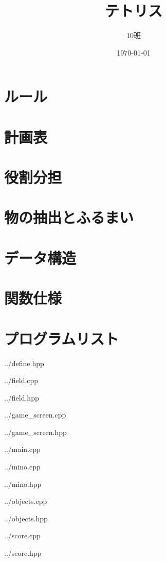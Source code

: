 \documentclass[11pt,a4paper]{jsarticle}
\title{テトリス}
\author{10班}
\date{\today}
\begin{document}
  \maketitle

  \section{ルール}
    
  \section{計画表}
    
  \section{役割分担}
    
  \section{物の抽出とふるまい}
    
  \clearpage
  \section{データ構造}
    
  \clearpage
  \section{関数仕様}
    
  \clearpage
  \section{プログラムリスト}
    
    {../define.hpp}
    
    {../field.cpp}
    
    {../field.hpp}
    
    {../game_screen.cpp}
    
    {../game_screen.hpp}
    
    {../main.cpp}
    
    {../mino.cpp}
    
    {../mino.hpp}
    
    {../objects.cpp}
    
    {../objects.hpp}
    
    {../score.cpp}
    
    {../score.hpp}
\end{document}
